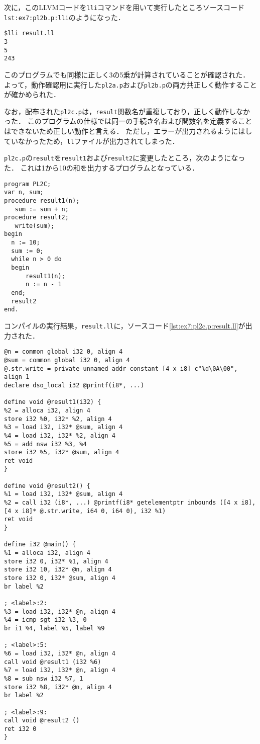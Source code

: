 \documentclass[uplatex]{jsarticle}
\begin{document}
次に，このLLVMコードを\verb#lli#コマンドを用いて実行したところソースコード\verb#lst:ex7:pl2b.p:lli#のようになった．

\begin{lstlisting}[caption=lliコマンド,label=lst:ex7:pl2b.p:lli]
$lli result.ll
3
5
243
\end{lstlisting}
このプログラムでも同様に正しく3の5乗が計算されていることが確認された．
よって，動作確認用に実行した\verb#pl2a.p#および\verb#pl2b.p#の両方共正しく動作することが確かめられた．

なお，配布された\verb#pl2c.p#は，\verb#result#関数名が重複しており，正しく動作しなかった．
このプログラムの仕様では同一の手続き名および関数名を定義することはできないため正しい動作と言える．
ただし，エラーが出力されるようにはしていなかったため，\verb#ll#ファイルが出力されてしまった．

\verb#pl2c.p#の\verb#result#を\verb#result1#および\verb#result2#に変更したところ，次のようになった．
これは1から10の和を出力するプログラムとなっている．
\begin{lstlisting}[caption=pl2c.p,label=lst:ex7:pl2c.p]
program PL2C;
var n, sum;
procedure result1(n);
   sum := sum + n;
procedure result2;
   write(sum);
begin
  n := 10;
  sum := 0;
  while n > 0 do
  begin
	  result1(n);
	  n := n - 1
  end;
  result2
end.
\end{lstlisting}

コンパイルの実行結果，\verb#result.ll#に，ソースコード\ref{lst:ex7:pl2c.p:result.ll}が出力された．
\begin{lstlisting}[caption=result.ll,label=lst:ex7:pl2c.p:result.ll]
@n = common global i32 0, align 4
@sum = common global i32 0, align 4
@.str.write = private unnamed_addr constant [4 x i8] c"%d\0A\00", align 1
declare dso_local i32 @printf(i8*, ...)

define void @result1(i32) {
%2 = alloca i32, align 4
store i32 %0, i32* %2, align 4
%3 = load i32, i32* @sum, align 4
%4 = load i32, i32* %2, align 4
%5 = add nsw i32 %3, %4
store i32 %5, i32* @sum, align 4
ret void
}

define void @result2() {
%1 = load i32, i32* @sum, align 4
%2 = call i32 (i8*, ...) @printf(i8* getelementptr inbounds ([4 x i8], [4 x i8]* @.str.write, i64 0, i64 0), i32 %1)
ret void
}

define i32 @main() {
%1 = alloca i32, align 4
store i32 0, i32* %1, align 4
store i32 10, i32* @n, align 4
store i32 0, i32* @sum, align 4
br label %2

; <label>:2:
%3 = load i32, i32* @n, align 4
%4 = icmp sgt i32 %3, 0
br i1 %4, label %5, label %9

; <label>:5:
%6 = load i32, i32* @n, align 4
call void @result1 (i32 %6)
%7 = load i32, i32* @n, align 4
%8 = sub nsw i32 %7, 1
store i32 %8, i32* @n, align 4
br label %2

; <label>:9:
call void @result2 ()
ret i32 0
}
\end{lstlisting}
\end{document}
